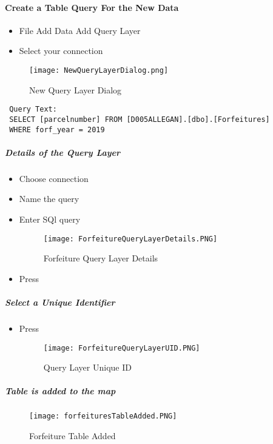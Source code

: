  \clearpage
 
 \paragraph{Create a Table Query For the New Data}
 \vspace{.25in}

 \begin{itemize}
 \setlength\itemsep{.2in}
 \item {\Large File \menuArrow Add Data \menuArrow Add Query Layer}
 \item {\Large Select your connection}
 \end{itemize}
 \begin{figure}[h!]
 \centering
     \texttt{[image: NewQueryLayerDialog.png]}
 \caption{New Query Layer Dialog}
 \end{figure}
 \begin{verbatim}
 Query Text:
 SELECT [parcelnumber] FROM [D005ALLEGAN].[dbo].[Forfeitures]
 WHERE forf_year = 2019
 \end{verbatim}
 \clearpage
 \subparagraph{Details of the Query Layer}
 \begin{itemize}
 \item Choose connection
 \item Name the query
 \item Enter SQl query
 \begin{figure}[h!]
 \centering
     \texttt{[image: ForfeitureQueryLayerDetails.PNG]}
 \caption{Forfeiture Query Layer Details}
 \end{figure}
 \item Press 
 \end{itemize}
 \clearpage
 \subparagraph{Select a Unique Identifier}
 \begin{itemize}
 \item Press 
 \begin{figure}[h!]
 \centering
     \texttt{[image: ForfeitureQueryLayerUID.PNG]}
 \caption{Query Layer Unique ID}
 \end{figure}
 \end{itemize}
 \clearpage
 \subparagraph*{Table is added to the map}
 \begin{figure}[h!]
 \centering
     \texttt{[image: forfeituresTableAdded.PNG]}
 \caption{Forfeiture Table Added}
 \end{figure}
 \clearpage
